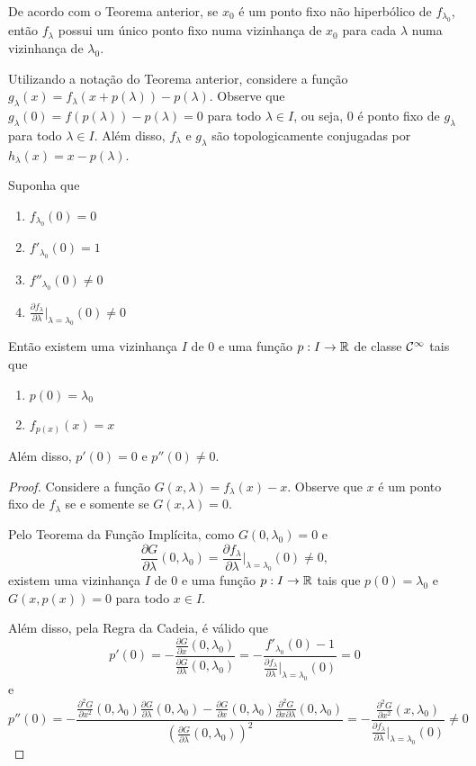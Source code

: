 De acordo com o Teorema anterior, se $x_0$ é um ponto fixo não hiperbólico de $f_{\lambda_0}$, então $f_\lambda$ possui um único ponto fixo numa vizinhança de $x_0$ para cada $\lambda$ numa vizinhança de $\lambda_0$.
 
Utilizando a notação do Teorema anterior, considere a função $g_\lambda(x) = f_\lambda(x + p(\lambda)) - p(\lambda)$. Observe que $g_\lambda(0) = f(p(\lambda)) - p(\lambda) = 0$ para todo $\lambda \in I$, ou seja, $0$ é ponto fixo de $g_\lambda$ para todo $\lambda \in I$. Além disso, $f_\lambda$ e $g_\lambda$ são topologicamente conjugadas por $h_\lambda(x) = x - p(\lambda)$.

\begin{theorem}
Suponha que
\begin{enumerate}
\item $f_{\lambda_0}(0) = 0$
\item $f'_{\lambda_0}(0) = 1$
\item $f''_{\lambda_0}(0) \neq 0$
\item $\frac{\partial f_\lambda}{\partial \lambda} |_{\lambda = \lambda_0}(0) \neq 0$
\end{enumerate}
Então existem uma vizinhança $I$ de $0$ e uma função $p: I \to \mathbb{R}$ de classe $\mathcal{C}^\infty$ tais que
\begin{enumerate}
\item $p(0) = \lambda_0$
\item $f_{p(x)}(x) = x$
\end{enumerate}
Além disso, $p'(0) = 0$ e $p''(0) \neq 0$.
\end{theorem}

\begin{proof}
Considere a função $G(x, \lambda) = f_\lambda(x) - x$. Observe que $x$ é um ponto fixo de $f_\lambda$ se e somente se $G(x, \lambda) = 0$.

Pelo Teorema da Função Implícita, como $G(0, \lambda_0) = 0$ e 
$$\frac{\partial G}{\partial \lambda}(0, \lambda_0) = \frac{\partial f_\lambda}{\partial \lambda}|_{\lambda = \lambda_0}(0) \neq 0,$$
existem uma vizinhança $I$ de $0$ e uma função $p: I \to \mathbb{R}$ tais que $p(0) = \lambda_0$ e $G(x, p(x)) = 0$ para todo $x \in I$.

Além disso, pela Regra da Cadeia, é válido que
$$p'(0) = - \frac{\frac{\partial G}{\partial x}(0, \lambda_0)}
{\frac{\partial G}{\partial \lambda}(0, \lambda_0)} = - \frac{f'_{\lambda_0}(0) - 1}{\frac{\partial f_\lambda}{\partial \lambda}|_{\lambda = \lambda_0}(0)} = 0$$
e
$$ p''(0) = - \frac{\frac{\partial^2 G}{\partial x^2}(0, \lambda_0)\frac{\partial G}{\partial \lambda}(0, \lambda_0) - \frac{\partial G}{\partial x}(0, \lambda_0) \frac{\partial^2 G}{ \partial x \partial \lambda}(0, \lambda_0)}
{\left( \frac{\partial G}{\partial \lambda}(0, \lambda_0) \right)^2}  = - \frac{\frac{\partial^2 G}{\partial x^2}(x, \lambda_0)}{ \frac{\partial f_\lambda}{\partial \lambda}|_{\lambda = \lambda_0}(0)} \neq 0 $$
\end{proof}


